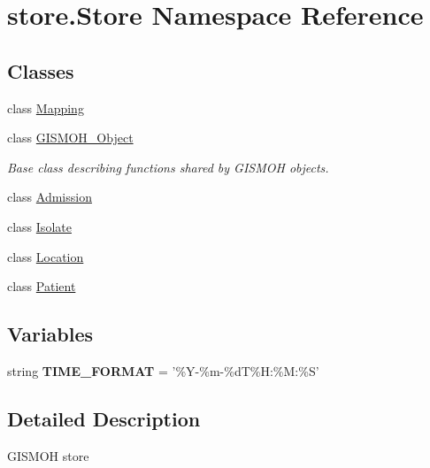 \hypertarget{namespacestore_1_1_store}{\section{store.\-Store Namespace Reference}
\label{namespacestore_1_1_store}
}
\subsection*{Classes}
\begin{DoxyCompactItemize}
\item 
class \hyperlink{classstore_1_1_store_1_1_mapping}{Mapping}
\item 
class \hyperlink{classstore_1_1_store_1_1_g_i_s_m_o_h___object}{G\-I\-S\-M\-O\-H\-\_\-\-Object}
\begin{DoxyCompactList}\small\item\em Base class describing functions shared by G\-I\-S\-M\-O\-H objects. \end{DoxyCompactList}\item 
class \hyperlink{classstore_1_1_store_1_1_admission}{Admission}
\item 
class \hyperlink{classstore_1_1_store_1_1_isolate}{Isolate}
\item 
class \hyperlink{classstore_1_1_store_1_1_location}{Location}
\item 
class \hyperlink{classstore_1_1_store_1_1_patient}{Patient}
\end{DoxyCompactItemize}
\subsection*{Variables}
\begin{DoxyCompactItemize}
\item 
\hypertarget{namespacestore_1_1_store_a53fdf27dcda71b32ea63bd7da67fd879}{string {\bfseries T\-I\-M\-E\-\_\-\-F\-O\-R\-M\-A\-T} = '\%Y-\/\%m-\/\%d\-T\%H\-:\%M\-:\%S'}\label{namespacestore_1_1_store_a53fdf27dcda71b32ea63bd7da67fd879}

\end{DoxyCompactItemize}


\subsection{Detailed Description}
\begin{DoxyVerb}GISMOH store
\end{DoxyVerb}
 